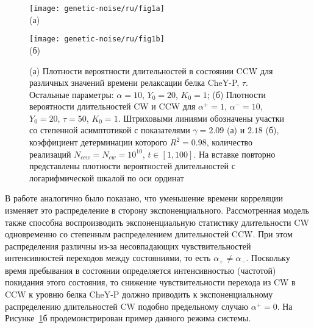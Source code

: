 \begin{figure}[ht]
    \begin{minipage}[b][][b]{0.47\linewidth}\centering
        \texttt{[image: genetic-noise/ru/fig1a]} \\ (а)
    \end{minipage}
    \hfill
    \begin{minipage}[b][][b]{0.47\linewidth}\centering
        \texttt{[image: genetic-noise/ru/fig1b]} \\ (б)
    \end{minipage}
    \caption{
        (а) Плотности вероятности длительностей в состоянии CCW для различных значений времени релаксации белка CheY-P, $\tau$. Остальные параметры: $\alpha = 10$, $Y_0 = 20$, $K_0 = 1$; (б) Плотности вероятности длительностей CW и CCW для $\alpha^+ = 1$, $\alpha^- = 10$, $Y_0 = 20$, $\tau = 50$, $K_0 = 1$. Штриховыми линиями обозначены участки со степенной асимптотикой с показателями $\gamma = 2.09$ (а) и $2.18$ (б), коэффициент детерминации которого $R^2 = 0.98$, количество реализаций $N_{ccw} = N_{cw} = 10^{10}$, $t \in [1, 100]$. На вставке повторно представлены плотности вероятностей длительностей с логарифмической шкалой по оси ординат
    }
    \label{fig:duration-pdf}
\end{figure}


В работе \cite{tu_how_2005} аналогично было показано, что уменьшение времени корреляции изменяет это распределение в сторону экспоненциального. Рассмотренная модель также способна воспроизводить экспоненциальную статистику длительности CW одновременно со степенным распределением длительностей CCW. При этом распределения различны из-за несовпадающих чувствительностей интенсивностей переходов между состояниями, то есть $\alpha_+ \neq \alpha_-$. Поскольку время пребывания в состоянии определяется интенсивностью (частотой) покидания этого состояния, то снижение чувствительности перехода из CW в CCW к уровню белка CheY-P должно приводить к экспоненциальному распределению длительностей CW подобно предельному случаю $\alpha^+ = 0$. На Рисунке~\cref{fig:duration-pdf}б продемонстрирован пример данного режима системы.

